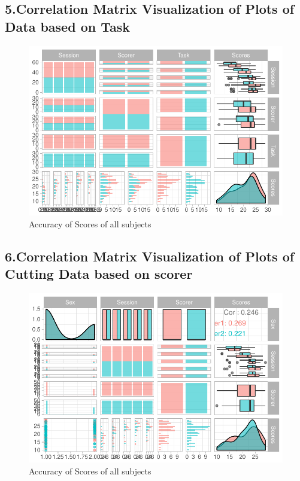 \documentclass[12pt,epsf]{report}
\begin{document}
{\subsection*{5.Correlation Matrix Visualization of Plots of Data based on Task}
\begin{figure}[!htb]
	\centering
	\includegraphics[width=1.0\textwidth]{Data_GGpairs.pdf}
	\caption{Accuracy of Scores of all subjects}
	\centering
\end{figure}
\FloatBarrier
\subsection*{6.Correlation Matrix Visualization of Plots of Cutting Data based on scorer}
\begin{figure}[!htb]
	\centering
	\includegraphics[width=1.0\textwidth]{Cutting_GGpairs.pdf}
	\caption{Accuracy of Scores of all subjects}
	\centering
\end{figure}
\FloatBarrier
}
\end{document}
